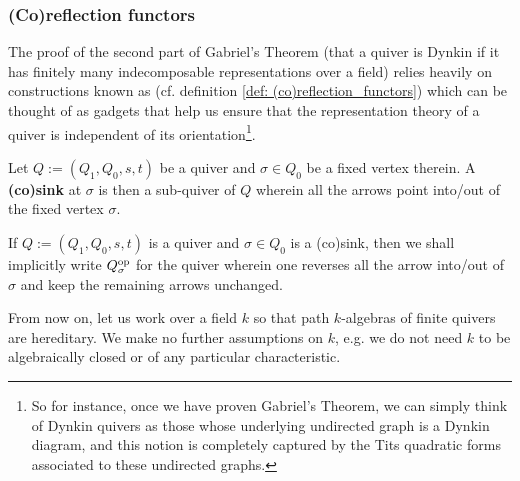         \subsubsection{(Co)reflection functors}
            The proof of the second part of Gabriel's Theorem (that a quiver is Dynkin if it has finitely many indecomposable representations over a field) relies heavily on constructions known as  (cf. definition \ref{def: (co)reflection_functors}) which can be thought of as gadgets that help us ensure that the representation theory of a quiver is independent of its orientation\footnote{So for instance, once we have proven Gabriel's Theorem, we can simply think of Dynkin quivers as those whose underlying undirected graph is a Dynkin diagram, and this notion is completely captured by the Tits quadratic forms associated to these undirected graphs.}. 
            \begin{definition}[(Co)sinks] \label{def: (co)sinks}
                Let $Q := (Q_1, Q_0, s, t)$ be a quiver and $\sigma \in Q_0$ be a fixed vertex therein. A \textbf{(co)sink} at $\sigma$ is then a sub-quiver of $Q$ wherein all the arrows point into/out of the fixed vertex $\sigma$. 
            \end{definition}
            \begin{convention}
                If $Q := (Q_1, Q_0, s, t)$ is a quiver and $\sigma \in Q_0$ is a (co)sink, then we shall implicitly write $Q_{\sigma}^{\mathrm{op}}$ for the quiver wherein one reverses all the arrow into/out of $\sigma$ and keep the remaining arrows unchanged.
            \end{convention}
            \begin{convention}
                From now on, let us work over a field $k$ so that path $k$-algebras of finite quivers are hereditary. We make no further assumptions on $k$, e.g. we do not need $k$ to be algebraically closed or of any particular characteristic.
            \end{convention}
